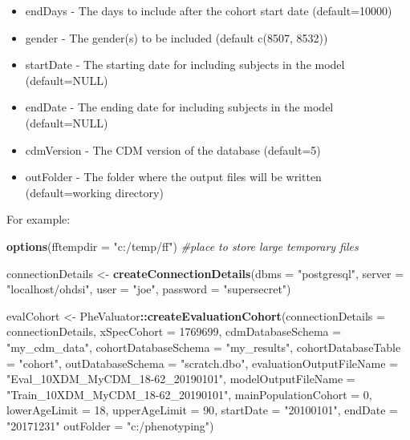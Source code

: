 \documentclass[]{article}
\newenvironment{Shaded}{\begin{snugshade}}{\end{snugshade}}
\newcommand{\CommentTok}[1]{\textcolor[rgb]{0.56,0.35,0.01}{\textit{#1}}}
\newcommand{\DataTypeTok}[1]{\textcolor[rgb]{0.13,0.29,0.53}{#1}}
\newcommand{\DecValTok}[1]{\textcolor[rgb]{0.00,0.00,0.81}{#1}}
\newcommand{\KeywordTok}[1]{\textcolor[rgb]{0.13,0.29,0.53}{\textbf{#1}}}
\newcommand{\NormalTok}[1]{#1}
\newcommand{\OperatorTok}[1]{\textcolor[rgb]{0.81,0.36,0.00}{\textbf{#1}}}
\newcommand{\StringTok}[1]{\textcolor[rgb]{0.31,0.60,0.02}{#1}}
\begin{document}
\begin{itemize}
  (default=-10000)
\item
  endDays - The days to include after the cohort start date
  (default=10000)
\item
  gender - The gender(s) to be included (default c(8507, 8532))
\item
  startDate - The starting date for including subjects in the model
  (default=NULL)
\item
  endDate - The ending date for including subjects in the model
  (default=NULL)
\item
  cdmVersion - The CDM version of the database (default=5)
\item
  outFolder - The folder where the output files will be written
  (default=working directory)
\end{itemize}

For example:

\begin{Shaded}
\begin{Highlighting}[]
\KeywordTok{options}\NormalTok{(}\DataTypeTok{fftempdir =} \StringTok{"c:/temp/ff"}\NormalTok{) }\CommentTok{#place to store large temporary files}


\NormalTok{connectionDetails <-}\StringTok{ }\KeywordTok{createConnectionDetails}\NormalTok{(}\DataTypeTok{dbms =} \StringTok{"postgresql"}\NormalTok{,}
                                              \DataTypeTok{server =} \StringTok{"localhost/ohdsi"}\NormalTok{,}
                                              \DataTypeTok{user =} \StringTok{"joe"}\NormalTok{,}
                                              \DataTypeTok{password =} \StringTok{"supersecret"}\NormalTok{)}

\NormalTok{evalCohort <-}\StringTok{ }\NormalTok{PheValuator}\OperatorTok{::}\KeywordTok{createEvaluationCohort}\NormalTok{(}\DataTypeTok{connectionDetails =}\NormalTok{ connectionDetails,}
                              \DataTypeTok{xSpecCohort =} \DecValTok{1769699}\NormalTok{, }
                              \DataTypeTok{cdmDatabaseSchema =} \StringTok{"my_cdm_data"}\NormalTok{,}
                              \DataTypeTok{cohortDatabaseSchema =} \StringTok{"my_results"}\NormalTok{,}
                              \DataTypeTok{cohortDatabaseTable =} \StringTok{"cohort"}\NormalTok{,}
                              \DataTypeTok{outDatabaseSchema =} \StringTok{"scratch.dbo"}\NormalTok{,}
                              \DataTypeTok{evaluationOutputFileName =} \StringTok{"Eval_10XDM_MyCDM_18-62_20190101"}\NormalTok{,}
                              \DataTypeTok{modelOutputFileName =} \StringTok{"Train_10XDM_MyCDM_18-62_20190101"}\NormalTok{,}
                              \DataTypeTok{mainPopulationCohort =} \DecValTok{0}\NormalTok{, }
                              \DataTypeTok{lowerAgeLimit =} \DecValTok{18}\NormalTok{, }
                              \DataTypeTok{upperAgeLimit =} \DecValTok{90}\NormalTok{,}
                              \DataTypeTok{startDate =} \StringTok{"20100101"}\NormalTok{,}
                              \DataTypeTok{endDate =} \StringTok{"20171231"}
                              \DataTypeTok{outFolder =} \StringTok{"c:/phenotyping"}\NormalTok{)}
\end{Highlighting}
\end{Shaded}
\end{document}
